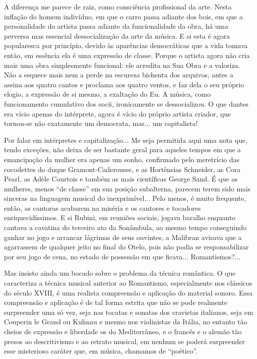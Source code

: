 A diferença me parece de raiz, como consciência profissional da arte.
Nesta inflação do homem indivíduo, em que o carro passa adiante dos
bois, em que a personalidade do artista passa adiante da funcionalidade
da obra, há uma perversa mas essencial dessocialização da arte da
música. E si esta é agora popularesca por princípio, devido às
aparências democráticas que a vida tomava então, em essência ela é uma
expressão de classe. Porque o artista agora não cria mais uma obra
simplesmente funcional: ele acredita na Sua Obra e a valoriza. Não a
esquece mais nem a perde na escureza bichenta dos arquivos, antes a
assina aos quatro cantos e proclama aos quatro ventos, e faz dela o seu
próprio elogio, a expressão de si mesmo, a exaltação do Eu. A música,
como funcionamento cumulativo dos socii, ironicamente se dessocializou.
O que dantes era vício apenas do intérprete, agora é vício do próprio
artista criador, que tornou-se não exatamente um democrata, mas... um
capitalista!

Por falar em intérpretes e capitalização... Me seja permitida aqui uma
nota que, tendo exceções, não deixa de ser bastante geral para aqueles
tempos em que a emancipação da mulher era apenas um sonho, confirmado
pelo meretrício das cocodettes do duque Gramont-Caderousse, e as
Hortênsias Schneider, as Cora Pearl, as Adèle Courtois e também as mais
científicas George Sand. É que as mulheres, menos ``de classe'' em sua
posição subalterna, parecem terem sido mais sinceras na linguagem
musical do inexprimível... Pelo menos, é muito frequente, então, as
cantoras acabarem na miséria e os cantores e tocadores
enriquecidíssimos. E si Rubini, em reuniões sociais, jogava baralho
enquanto cantava a cavatina do terceiro ato da Sonâmbula, ao mesmo tempo
conseguindo ganhar no jogo e arrancar lágrimas de seus ouvintes, a
Malibran avisava que a agarrassem de qualquer jeito no final do Otelo,
pois não podia se responsabilizar por seu jogo de cena, no estado de
possessão em que ficava... Romantismos?...

Mas insisto ainda um bocado sobre o problema da técnica romântica. O que
caracteriza a técnica musical anterior ao Romantismo, especialmente nos
clássicos do século XVIII, é uma realista compreensão e aplicação do
material sonoro. Essa compreensão e aplicação é de tal forma estrita que
não se pode realmente surpreender uma só vez, seja nas tocatas e sonatas
dos cravistas italianos, seja em Couperin le Grand ou Kuhnau e mesmo nos
violinistas da Itália, no entanto tão cheios de expressão e liberdade os
do Mediterrâneo, e o francês e o alemão tão presos ao descritivismo e ao
retrato musical, em nenhum se poderá surpreender esse misterioso caráter
que, em música, chamamos de ``poético''.

